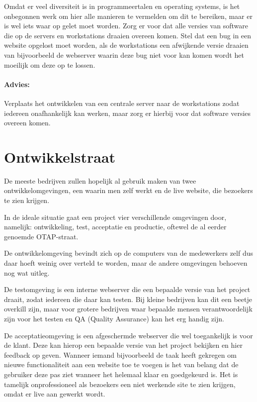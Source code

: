 Omdat er veel diversiteit is in programmeertalen en operating systems, is het onbegonnen werk om hier alle manieren te vermelden om dit te bereiken, maar er is wel iets waar op gelet moet worden. Zorg er voor dat alle versies van software die op de servers en workstations draaien overeen komen. Stel dat een bug in een website opgelost moet worden, als de workstations een afwijkende versie draaien van bijvoorbeeld de webserver waarin deze bug niet voor kan komen wordt het moeilijk om deze op te lossen.

\paragraph{Advies:} Verplaats het ontwikkelen van een centrale server naar de workstations zodat iedereen onafhankelijk kan werken, maar zorg er hierbij voor dat software versies overeen komen.

\section{Ontwikkelstraat}

De meeste bedrijven zullen hopelijk al gebruik maken van twee ontwikkelomgevingen, een waarin men zelf werkt en de live website, die bezoekers te zien krijgen.

In de ideale situatie gaat een project vier verschillende omgevingen door, namelijk: ontwikkeling, test, acceptatie en productie, oftewel de al eerder genoemde OTAP-straat. 

De ontwikkelomgeving bevindt zich op de computers van de medewerkers zelf dus daar hoeft weinig over verteld te worden, maar de andere omgevingen behoeven nog wat uitleg.

De testomgeving is een interne webserver die een bepaalde versie van het project draait, zodat iedereen die daar kan testen. Bij kleine bedrijven kan dit een beetje overkill zijn, maar voor grotere bedrijven waar bepaalde mensen verantwoordelijk zijn voor het testen en QA (Quality Assurance) kan het erg handig zijn.

De acceptatieomgeving is een afgeschermde webserver die wel toegankelijk is voor de klant. Deze kan hierop een bepaalde versie van het project bekijken en hier feedback op geven. Wanneer iemand bijvoorbeeld de taak heeft gekregen om nieuwe functionaliteit aan een website toe te voegen is het van belang dat de gebruiker deze pas ziet wanneer het helemaal klaar en goedgekeurd is. Het is tamelijk onprofessioneel als bezoekers een niet werkende site te zien krijgen, omdat er live aan gewerkt wordt.

